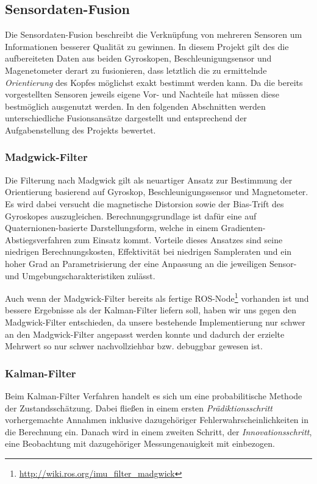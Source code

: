 
\subsection{Sensordaten-Fusion}
\label{headtracking_fusion_subsec}
Die Sensordaten-Fusion beschreibt die Verknüpfung von mehreren Sensoren um Informationen besserer Qualität zu gewinnen. In diesem Projekt gilt des die aufbereiteten Daten aus beiden Gyroskopen, Beschleunigungsensor und Magenetometer derart zu fusionieren, dass letztlich die zu ermittelnde \emph{Orientierung} des Kopfes möglichst exakt bestimmt werden kann. Da die bereits vorgestellten Sensoren jeweils eigene Vor- und Nachteile hat müssen diese bestmöglich ausgenutzt werden. In den folgenden Abschnitten werden unterschiedliche Fusionsansätze dargestellt und entsprechend der Aufgabenstellung des Projekts bewertet. 

\subsubsection{Madgwick-Filter}
Die Filterung nach Madgwick \cite{madgwick2010efficient} gilt als neuartiger Ansatz zur Bestimmung der Orientierung basierend auf Gyroskop, Beschleunigungssensor und Magnetometer.
Es wird dabei versucht die magnetische Distorsion sowie der Bias-Trift des Gyroskopes auszugleichen.
Berechnungsgrundlage ist dafür eine auf Quaternionen-basierte Darstellungsform, welche in einem Gradienten-Abstiegsverfahren zum Einsatz kommt.
Vorteile dieses Ansatzes sind seine niedrigen Berechnungskosten, Effektivität bei niedrigen Sampleraten und ein hoher Grad an Parametrisierung der eine Anpassung an die jeweiligen Sensor- und Umgebungscharakteristiken zulässt.

Auch wenn der Madgwick-Filter bereits als fertige ROS-Node\footnote{\url{http://wiki.ros.org/imu_filter_madgwick}} vorhanden ist und bessere Ergebnisse als der Kalman-Filter liefern soll, haben wir uns gegen den Madgwick-Filter entschieden, da unsere bestehende Implementierung nur schwer an den Madgwick-Filter angepasst werden konnte und dadurch der erzielte Mehrwert so nur schwer nachvollziehbar bzw. debuggbar gewesen ist. 


\subsubsection{Kalman-Filter}
Beim Kalman-Filter Verfahren  handelt es sich um eine probabilitische Methode der Zustandsschätzung.
Dabei fließen in einem ersten \emph{Prädiktionsschritt} vorhergemachte Annahmen inklusive dazugehöriger Fehlerwahrscheinlichkeiten in die Berechnung ein.
Danach wird in einem zweiten Schritt, der \emph{Innovationsschritt}, eine Beobachtung mit dazugehöriger Messungenauigkeit mit einbezogen.

